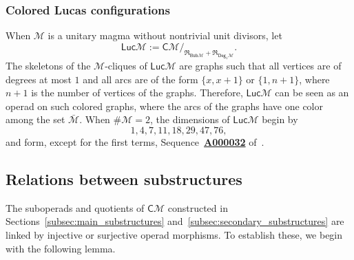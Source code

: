 \documentclass[10pt,reqno]{amsart}
\numberwithin{equation}{subsection}
\newcommand{\Mca}{\mathcal{M}}
\newcommand{\Cli}{\mathsf{C}}
\newcommand{\Bub}{\mathsf{Bub}}
\newcommand{\Deg}{\mathsf{Deg}}
\newcommand{\Luc}{\mathsf{Luc}}
\newcommand{\Rel}{\mathfrak{R}}
\newcommand{\OEIS}[1]{\href{http://oeis.org/#1}{{\bf #1}}}
\begin{document}
\subsubsection{Colored Lucas configurations}
When $\Mca$ is a unitary magma without nontrivial unit divisors, let
\begin{equation}
    \Luc\Mca := \Cli\Mca/_{\Rel_{\Bub\Mca} + \Rel_{\Deg_1\Mca}}.
\end{equation}
The skeletons of the $\Mca$-cliques of $\Luc\Mca$ are graphs such that
all vertices are of degrees at most $1$ and all arcs are of the form
$\{x, x + 1\}$ or $\{1, n + 1\}$, where $n + 1$ is the number of
vertices of the graphs. Therefore, $\Luc\Mca$ can be seen as an operad
on such colored graphs, where the arcs of the graphs have one color
among the set $\bar{\Mca}$. When $\# \Mca = 2$, the dimensions of
$\Luc\Mca$ begin by
\begin{equation}
    1, 4, 7, 11, 18, 29, 47, 76,
\end{equation}
and form, except for the first terms, Sequence~\OEIS{A000032}
of~\cite{Slo}.
\medskip

\subsection{Relations between substructures}
The suboperads and quotients of $\Cli\Mca$ constructed in
Sections~\ref{subsec:main_substructures}
and~\ref{subsec:secondary_substructures} are linked by injective or
surjective operad morphisms. To establish these, we begin with the
following lemma.
\medskip
\end{document}
